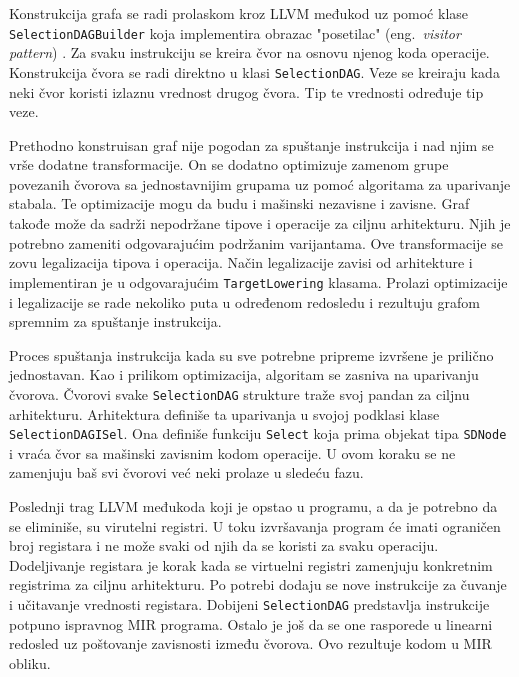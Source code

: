 \documentclass[12pt,oneside]{memoir}
\begin{document}
Konstrukcija grafa se radi prolaskom kroz LLVM međukod uz pomoć klase \verb|SelectionDAGBuilder| koja implementira obrazac "posetilac" (eng.~{\em visitor pattern}) \cite{gamma1995design}. 
Za svaku instrukciju se kreira čvor na osnovu njenog koda operacije.
Konstrukcija čvora se radi direktno u klasi \verb|SelectionDAG|.
Veze se kreiraju kada neki čvor koristi izlaznu vrednost drugog čvora.
Tip te vrednosti određuje tip veze.

Prethodno konstruisan graf nije pogodan za spuštanje instrukcija i nad njim se vrše dodatne transformacije.
On se dodatno optimizuje zamenom grupe povezanih čvorova sa jednostavnijim grupama uz pomoć algoritama za uparivanje stabala.
Te optimizacije mogu da budu i mašinski nezavisne i zavisne.
Graf takođe može da sadrži nepodržane tipove i operacije za ciljnu arhitekturu.
Njih je potrebno zameniti odgovarajućim podržanim varijantama.
Ove transformacije se zovu legalizacija tipova i operacija.
Način legalizacije zavisi od arhitekture i implementiran je u odgovarajućim \verb|TargetLowering| klasama.
Prolazi optimizacije i legalizacije se rade nekoliko puta u određenom redosledu i rezultuju grafom spremnim za spuštanje instrukcija.

Proces spuštanja instrukcija kada su sve potrebne pripreme izvršene je prilično jednostavan.
Kao i prilikom optimizacija, algoritam se zasniva na uparivanju čvorova.
Čvorovi svake \verb|SelectionDAG| strukture traže svoj pandan za ciljnu arhitekturu.
Arhitektura definiše ta uparivanja u svojoj podklasi klase \verb|SelectionDAGISel|.
Ona definiše funkciju \verb|Select| koja prima objekat tipa \verb|SDNode| i vraća čvor sa mašinski zavisnim kodom operacije.
U ovom koraku se ne zamenjuju baš svi čvorovi već neki prolaze u sledeću fazu.

Poslednji trag LLVM međukoda koji je opstao u programu, a da je potrebno da se eliminiše, su virutelni registri.
U toku izvršavanja program će imati ograničen broj registara i ne može svaki od njih da se koristi za svaku operaciju.
Dodeljivanje registara je korak kada se virtuelni registri zamenjuju konkretnim registrima za ciljnu arhitekturu.
Po potrebi dodaju se nove instrukcije za čuvanje i učitavanje vrednosti registara.
Dobijeni \verb|SelectionDAG| predstavlja instrukcije potpuno ispravnog MIR programa.
Ostalo je još da se one rasporede u linearni redosled uz poštovanje zavisnosti između čvorova.
Ovo rezultuje kodom u MIR obliku.
\end{document}
